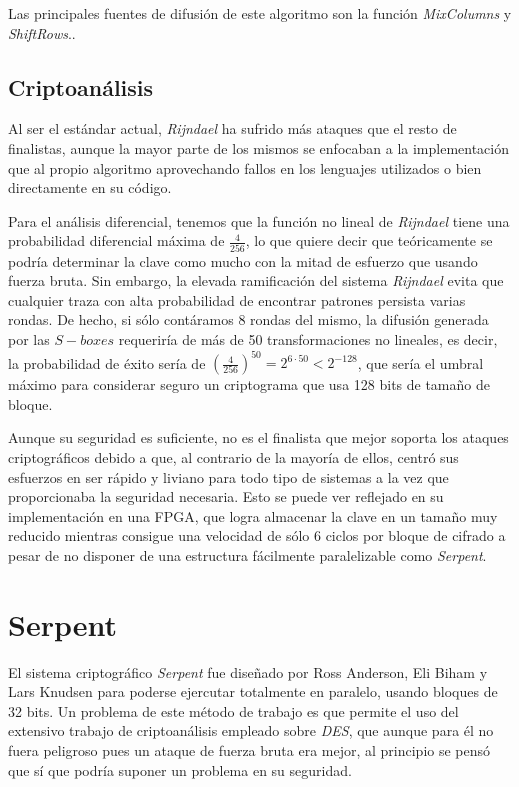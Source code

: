 Las principales fuentes de difusión de este algoritmo son la función \textit{MixColumns} y \textit{ShiftRows}.\cite{Rijndael_design}.

\subsection{Criptoanálisis}
Al ser el estándar actual, \textit{Rijndael} ha sufrido más ataques que el resto de finalistas, aunque la mayor parte de los mismos se enfocaban a la implementación que al propio algoritmo aprovechando fallos en los lenguajes utilizados o bien directamente en su código.

Para el análisis diferencial, tenemos que la función no lineal de \textit{Rijndael} tiene una probabilidad diferencial máxima de $\frac{4}{256}$, lo que quiere decir que teóricamente se podría determinar la clave como mucho con la mitad de esfuerzo que usando fuerza bruta. Sin embargo, la elevada ramificación del sistema \textit{Rijndael} evita que cualquier traza con alta probabilidad de encontrar patrones persista varias rondas. De hecho, si sólo contáramos 8 rondas del mismo, la difusión generada por las $S-boxes$ requeriría de más de 50 transformaciones no lineales, es decir, la probabilidad de éxito sería de $\left(\frac{4}{256}\right)^{50} = 2^{6 \cdot 50} < 2^{-128}$, que sería el umbral máximo para considerar seguro un criptograma que usa 128 bits de tamaño de bloque. \cite{Rijndael_crypto}

Aunque su seguridad es suficiente, no es el finalista que mejor soporta los ataques criptográficos debido a que, al contrario de la mayoría de ellos, centró sus esfuerzos en ser rápido y liviano para todo tipo de sistemas a la vez que proporcionaba la seguridad necesaria\cite{Rijndael_design}. Esto se puede ver reflejado en su implementación en una FPGA\cite{FPGA_Finalists}, que logra almacenar la clave en un tamaño muy reducido mientras consigue una velocidad de sólo 6 ciclos por bloque de cifrado a pesar de no disponer de una estructura fácilmente paralelizable como \textit{Serpent}.

\section{Serpent}
\label{sec:serpent}
El sistema criptográfico \textit{Serpent} fue diseñado por Ross Anderson, Eli Biham y Lars Knudsen para poderse ejercutar totalmente en paralelo, usando bloques de 32 bits. Un problema de este método de trabajo es que permite el uso del extensivo trabajo de criptoanálisis empleado sobre \textit{DES}, que aunque para él no fuera peligroso pues un ataque de fuerza bruta era mejor, al principio se pensó que sí que podría suponer un problema en su seguridad.

